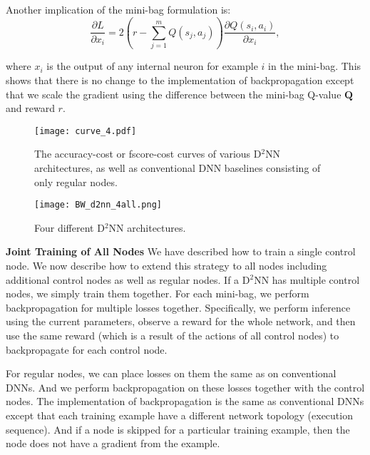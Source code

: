 \documentclass[10pt,twocolumn,letterpaper]{article}
\begin{document}
Another implication of the mini-bag formulation is: 
 \begin{equation} 
\frac{\partial L}  {\partial x_i} =
2(r - \sum_{j=1}^mQ(s_j,a_j)) \frac{\partial Q(s_i,a_i)} {\partial x_i}, 
\label{eqn:bag-backprop}
 \end{equation}

where $x_i$ is the output of any internal neuron for example $i$ in the
mini-bag. 
This shows that there is no change to the implementation
of backpropagation except that we scale the gradient using the difference between the mini-bag
Q-value $\mathbf{Q}$ and reward $r$. 

\begin{figure*}[t] \centering
\texttt{[image: curve\_4.pdf]}
\caption{The accuracy-cost or fscore-cost curves of various D$^2$NN architectures, as well as
  conventional DNN baselines consisting of only regular nodes. }
\label{fig:curve_4}
\end{figure*}

\begin{figure*}[t] \centering
\texttt{[image: BW\_d2nn\_4all.png]}
\caption{Four different D$^2$NN architectures.}
\label{fig:d2nn_4all}
\end{figure*}

\smallskip \noindent \textbf{Joint Training of All Nodes}
We have described how to train a single control node.
We now describe how to extend this strategy to all nodes including additional control
nodes as well as regular nodes. 
If a D$^2$NN has multiple control nodes, we simply train them together. For each
mini-bag, we perform backpropagation for multiple losses together. Specifically, we
perform inference using the current parameters, observe a reward for the whole network,
and then use the same reward (which is a result of the actions of all control nodes) to
backpropagate for each control node. 

For regular nodes, we can place losses on them the same as on conventional
DNNs. And we perform backpropagation on these losses together with the control
nodes. The implementation of backpropagation is the same as conventional DNNs except that
each training example have a different network topology (execution sequence).
And if a node is skipped for a particular training
example, then the node does not have a gradient from the example.
\end{document}
